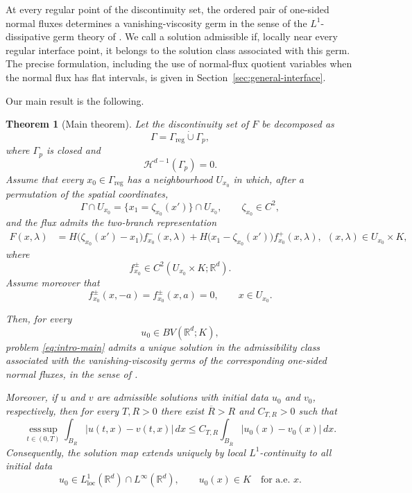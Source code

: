 \documentclass[11pt]{amsart}
\numberwithin{equation}{section}
\theoremstyle{plain}
\newtheorem{theorem}{Theorem}[section]
\theoremstyle{definition}
\theoremstyle{remark}
\begin{document}
At every regular point of the discontinuity set, the ordered pair of
one-sided normal fluxes determines a vanishing-viscosity germ in the sense of
the \(L^1\)-dissipative germ theory of \cite{AKR,AM}. We call a solution
admissible if, locally near every regular interface point, it belongs to the
solution class associated with this germ. The precise formulation, including
the use of normal-flux quotient variables when the normal flux has flat
intervals, is given in Section~\ref{sec:general-interface}.

Our main result is the following.

\begin{theorem}[Main theorem]
\label{thm:intro-main}
Let the discontinuity set of \(F\) be decomposed as
\[
    \Gamma
    =
    \Gamma_{\mathrm{reg}}
    \mathbin{\dot\cup}
    \Gamma_p,
\]
where \(\Gamma_p\) is closed and
\[
    \mathcal H^{d-1}(\Gamma_p)=0.
\]
Assume that every \(x_0\in\Gamma_{\mathrm{reg}}\) has a neighbourhood
\(U_{x_0}\) in which, after a permutation of the spatial coordinates,
\[
    \Gamma\cap U_{x_0}
    =
    \{x_1=\zeta_{x_0}(x')\}\cap U_{x_0},
    \qquad
    \zeta_{x_0}\in C^2,
\]
and the flux admits the two-branch representation
\begin{equation}\label{eq:intro-local-flux}
\begin{aligned}
    F(x,\lambda)
    &=
    H\bigl(\zeta_{x_0}(x')-x_1\bigr)
    f_{x_0}^-(x,\lambda)+
    H\bigl(x_1-\zeta_{x_0}(x')\bigr)
    f_{x_0}^+(x,\lambda),
    \ \
    (x,\lambda)\in U_{x_0}\times K,
\end{aligned}
\end{equation}
where
\[
    f_{x_0}^\pm
    \in
    C^2(U_{x_0}\times K;\mathbb R^d).
\]
Assume moreover that
\[
    f_{x_0}^\pm(x,-a)
    =
    f_{x_0}^\pm(x,a)
    =
    0,
    \qquad x\in U_{x_0}.
\]

Then, for every
\[
    u_0\in BV(\mathbb R^d;K),
\]
problem \eqref{eq:intro-main} admits a unique solution in the admissibility
class associated with the vanishing-viscosity germs of the corresponding
one-sided normal fluxes, in the sense of \cite{AKR,AM}.

Moreover, if \(u\) and \(v\) are admissible solutions with initial data
\(u_0\) and \(v_0\), respectively, then for every \(T,R>0\) there exist
\(\overline R>R\) and \(C_{T,R}>0\) such that
\begin{equation}\label{eq:intro-stability}
    \operatorname*{ess\,sup}_{t\in(0,T)}
    \int_{B_R}|u(t,x)-v(t,x)|\,dx
    \leq
    C_{T,R}
    \int_{B_{\overline R}}
        |u_0(x)-v_0(x)|\,dx.
\end{equation}
Consequently, the solution map extends uniquely by local
\(L^1\)-continuity to all initial data
\[
    u_0
    \in
    L^1_{\mathrm{loc}}(\mathbb R^d)
    \cap L^\infty(\mathbb R^d),
    \qquad
    u_0(x)\in K
    \quad\text{for a.e. }x.
\]
\end{theorem}
\end{document}
